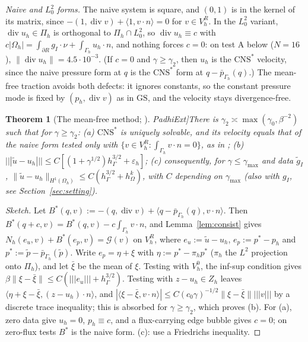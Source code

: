 \documentclass[5p,times]{elsarticle}
\newtheorem{theorem}{Theorem}
\theoremstyle{definition}
\newcommand{\hG}{h_\Gamma}
\newcommand{\hO}{h_\Omega}
\newcommand{\Gh}{\Gamma_h}
\newcommand{\Oh}{\Omega_h}
\newcommand{\VR}{V_h^R}
\newcommand{\VO}{V_h^0}
\newcommand{\Pih}{\Pi_h}
\newcommand{\Zh}{Z_h}
\newcommand{\gI}{g_I}
\newcommand{\ut}{\tilde u}
\newcommand{\pt}{\tilde p}
\newcommand{\pbG}{\bar p_{\Gamma_h}}
\newcommand{\ip}[2]{\langle #1,#2\rangle}
\newcommand{\tnorm}[1]{|\!|\!|#1|\!|\!|}
\newcommand{\norm}[1]{\lVert #1\rVert}
\newcommand{\GS}{\mathrm{GS}}
\newcommand{\CNS}{\mathrm{CNS}^\ast}
\newcommand{\eps}{\varepsilon_h}
\newcommand{\Gc}{\mathcal G}
\renewcommand{\div}{\operatorname{div}}
\newcommand{\ext}[1]{\cite[#1]{PadhiExt}}
\begin{document}
\emph{Naive and $L^2_0$ forms.}\label{prop:naive} The naive system is square, and $(0,1)$ is in the kernel of its matrix, since $-(1,\div v)+\ip{1}{v\cdot n}=0$ for $v\in\VR$. In the $L^2_0$ variant, $\div u_h\in\Pih$ is orthogonal to $\Pih\cap L^2_0$, so $\div u_h\equiv c$ with $c|\Oh|=\int_{\partial R}\gI\cdot\nu+\int_{\Gh}u_h\cdot n$, and nothing forces $c=0$: on test A below ($N=16$), $\norm{\div u_h}=4.5\cdot10^{-3}$. (If $c=0$ and $\gamma\ge\gamma_2$, then $u_h$ is the $\CNS$ velocity, since the naive pressure form at $q$ is the $\CNS$ form at $q-\pbG(q)$.) The mean-free traction avoids both defects: it ignores constants, so the constant pressure mode is fixed by $(p_h,\div v)$ as in $\GS$, and the velocity stays divergence-free.

\begin{theorem}[The mean-free method; \ext{Thm.~7.2, Rem.~7.3}]\label{thm:cns}
There is $\gamma_2\asymp\max(\gamma_0,\beta^{-2})$ such that for $\gamma\ge\gamma_2$:
(a) $\CNS$ is uniquely solvable, and its velocity equals that of the naive form tested only with $\{v\in\VR:\int_{\Gh}v\cdot n=0\}$, as in \cite{FrachonNilssonZahedi2024};
(b) $\tnorm{\ut-u_h}\le C[(1+\gamma^{1/2})\hG^{3/2}+\eps]$;
(c) consequently, for $\gamma\le\gamma_{\max}$ and data $\tilde g_I$, $\norm{\ut-u_h}_{H^1(\Oh)}\le C(\hG^{3/2}+\hO^k)$, with $C$ depending on $\gamma_{\max}$ (also with $\gI$, see Section~\ref{sec:setting}).
\end{theorem}

\begin{proof}[Sketch]
Let $B^\ast(q,v):=-(q,\div v)+\ip{q-\pbG(q)}{v\cdot n}$. Then $B^\ast(q+c,v)=B^\ast(q,v)-c\int_{\Gh}v\cdot n$, and Lemma~\ref{lem:consist} gives $N_h(e_u,v)+B^\ast(e_p,v)=\Gc(v)$ on $\VR$, where $e_u:=\ut-u_h$, $e_p:=p^\ast-p_h$ and $p^\ast:=\pt-\pbG(\pt)$. Write $e_p=\eta+\xi$ with $\eta:=p^\ast-\pi_hp^\ast$ ($\pi_h$ the $L^2$ projection onto $\Pih$), and let $\bar\xi$ be the mean of $\xi$. Testing with $\VO$, the inf-sup condition gives $\beta\norm{\xi-\bar\xi}\le C(\tnorm{e_u}+\hG^{3/2})$. Testing with $z-u_h\in\Zh$ leaves $\ip{\eta+\xi-\bar\xi}{(z-u_h)\cdot n}$, and $|\ip{\xi-\bar\xi}{v\cdot n}|\le C(c_0\gamma)^{-1/2}\norm{\xi-\bar\xi}\tnorm v$ by a discrete trace inequality; this is absorbed for $\gamma\ge\gamma_2$, which proves (b). For (a), zero data give $u_h=0$, $p_h\equiv c$, and a flux-carrying edge bubble gives $c=0$; on zero-flux tests $B^\ast$ is the naive form. (c): use a Friedrichs inequality.
\end{proof}
\end{document}
